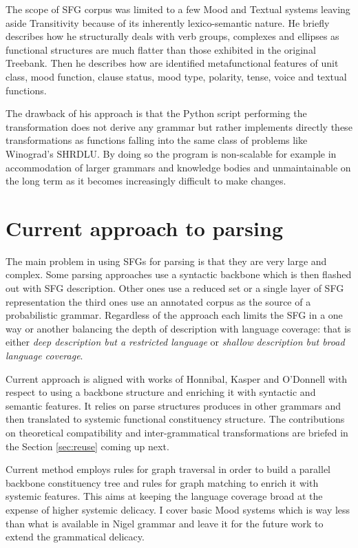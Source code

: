 The scope of SFG corpus was limited to a few Mood and Textual systems leaving aside Transitivity because of its inherently lexico-semantic nature. He briefly describes how he structurally deals with verb groups, complexes and ellipses as functional structures are much flatter than those exhibited in the original Treebank. Then he describes how are identified metafunctional features of unit class, mood function, clause status, mood type, polarity, tense, voice and textual functions.

The drawback of his approach is that the Python script performing the transformation does not derive any grammar but rather implements directly these transformations as functions falling into the same class of problems like Winograd's SHRDLU. By doing so the program is non-scalable for example in accommodation of larger grammars and knowledge bodies and unmaintainable on the long term as it becomes increasingly difficult to make changes. 

\section{Current approach to parsing}
The main problem in using SFGs for parsing is that they are very large and complex. Some parsing approaches use a syntactic backbone which is then flashed out with SFG description. Other ones use a reduced set or a single layer of SFG representation the third ones use an annotated corpus as the source of a probabilistic grammar. Regardless of the approach each limits the SFG in a one way or another balancing the depth of description with language coverage: that is either \textit{deep description but a restricted language} or \textit{shallow description but broad language coverage}. 

Current approach is aligned with works of Honnibal, Kasper and O'Donnell with respect to using a backbone structure and enriching it with syntactic and semantic features. It relies on parse structures produces in other grammars and then translated to systemic functional constituency structure. The contributions on theoretical compatibility and inter-grammatical transformations are briefed in the Section \ref{sec:reuse} coming up next. 

Current method employs rules for graph traversal in order to build a parallel backbone constituency tree and rules for graph matching to enrich it with systemic features. This aims at keeping the language coverage broad at the expense of higher systemic delicacy. I cover basic Mood systems which is way less than what is available in Nigel grammar and leave it for the future work to extend the grammatical delicacy.

